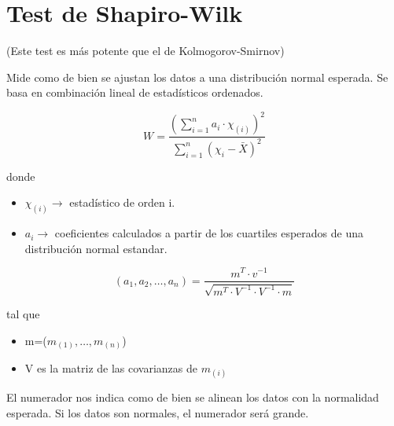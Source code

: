 \section{Test de Shapiro-Wilk}
(Este test es más potente que el de Kolmogorov-Smirnov)

Mide como de bien se ajustan los datos a una distribución normal esperada. Se basa en combinación lineal de estadísticos ordenados. %

\[
    W=\frac{\left(\sum_{i=1}^{n} a_i \cdot \chi_{(i)}\right)^2}{\sum_{i=1}^{n}(\chi_i-\bar{X})^2}
\]

donde

\begin{itemize}
    \item $\chi_{(i)} \longrightarrow$ estadístico de orden i.
    \item $a_i \longrightarrow$ coeficientes calculados a partir de los cuartiles esperados de una distribución normal estandar. 
\end{itemize}

\[
    (a_1,a_2,\dots,a_n)=\frac{m^T\cdot v^{-1}}{\sqrt{m^T \cdot V^{-1} \cdot V^{-1} \cdot m}}
\]

tal que

\begin{itemize}
    \item m=($m_{(1)},\dots,m_{(n)}$)
    \item V es la matriz de las covarianzas de $m_{(i)}$
\end{itemize}

El numerador nos indica como de bien se alinean los datos con la normalidad esperada. Si los datos son normales, el numerador será grande.